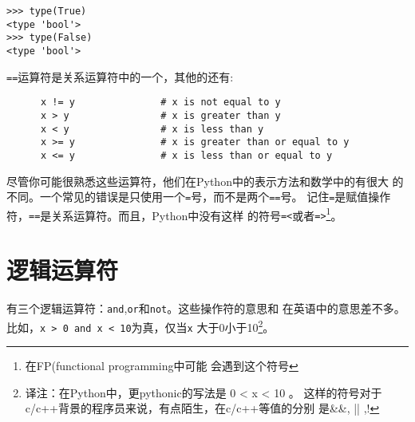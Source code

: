 \beforeverb
\begin{verbatim}
>>> type(True)
<type 'bool'>
>>> type(False)
<type 'bool'>
\end{verbatim}
\afterverb

{\tt ==}运算符是关系运算符中的一个，其他的还有:

\beforeverb
\begin{verbatim}
      x != y               # x is not equal to y
      x > y                # x is greater than y
      x < y                # x is less than y
      x >= y               # x is greater than or equal to y
      x <= y               # x is less than or equal to y
\end{verbatim}
\afterverb


尽管你可能很熟悉这些运算符，他们在Python中的表示方法和数学中的有很大
的不同。一个常见的错误是只使用一个{\tt =}号，而不是两个{\tt ==}号。
记住{\tt =}是赋值操作符，{\tt ==}是关系运算符。而且，Python中没有这样
的符号{\tt =<}或者{\tt =>}\footnote{在FP(functional programming中可能
会遇到这个符号}。


\section{逻辑运算符}

有三个逻辑运算符：{\tt and},{\tt or}和{\tt not}。这些操作符的意思和
在英语中的意思差不多。比如，{\tt x > 0 and x < 10}为真，仅当{\tt x}
大于0小于10\footnote{译注：在Python中，更pythonic的写法是 0 < x < 10
。  这样的符号对于c/c++背景的程序员来说，有点陌生，在c/c++等值的分别
是\&\&, || ,!}。



